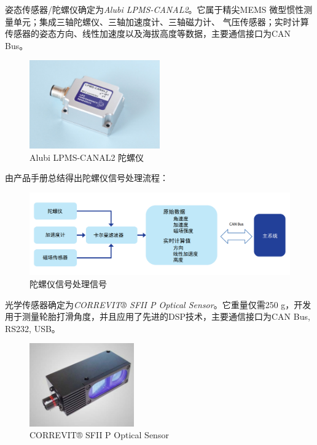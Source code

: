 姿态传感器/陀螺仪确定为\emph{Alubi LPMS-CANAL2}。它属于精尖MEMS 微型惯性测量单元；集成三轴陀螺仪、三轴加速度计、三轴磁力计、 气压传感器；实时计算传感器的姿态方向、线性加速度以及海拔高度等数据，主要通信接口为CAN Bus。

\begin{figure}[H]
	\centering
	\includegraphics[width = 0.5\textwidth]{fig/tly.png}
	\caption{Alubi LPMS-CANAL2 陀螺仪}
	\label{tly}
\end{figure}

由产品手册总结得出陀螺仪信号处理流程：

\begin{figure}[H]
	\centering
	\includegraphics[width = 1\textwidth]{fig/tly_pipeline.png}
	\caption{陀螺仪信号处理信号}
	\label{tly_pipeline}
\end{figure}

光学传感器确定为\emph{CORREVIT® SFII P Optical Sensor}。它重量仅需250 g，开发用于测量轮胎打滑角度，并且应用了先进的DSP技术，主要通信接口为CAN Bus, RS232, USB。

\begin{figure}[H]
	\centering
	\includegraphics[width = 0.4\textwidth]{fig/gxcgq.png}
	\caption{CORREVIT® SFII P Optical Sensor}
	\label{gxcgq}
\end{figure}


